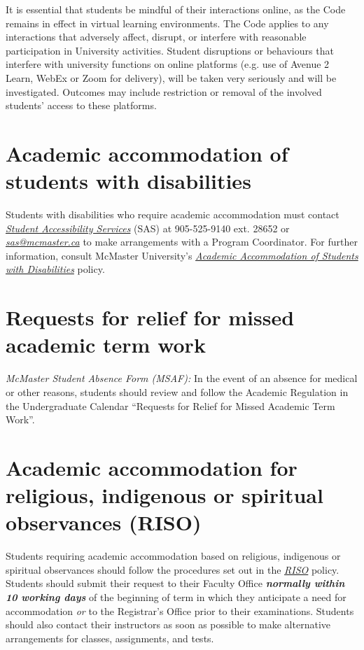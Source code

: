 \documentclass[12pt]{article}
\begin{document}
It is essential that students be mindful of their interactions online,
as the Code remains in effect in virtual learning environments. The Code
applies to any interactions that adversely affect, disrupt, or interfere
with reasonable participation in University activities. Student
disruptions or behaviours that interfere with university functions on
online platforms (e.g. use of Avenue 2 Learn, WebEx or Zoom for
delivery), will be taken very seriously and will be investigated.
Outcomes may include restriction or removal of the involved students'
access to these platforms.

\section*{Academic accommodation of students with disabilities}

Students with disabilities who require academic accommodation must
contact \href{https://sas.mcmaster.ca/}{\emph{Student Accessibility
Services}} (SAS) at 905-525-9140 ext. 28652 or
\href{mailto:sas@mcmaster.ca}{\emph{sas@mcmaster.ca}} to make
arrangements with a Program Coordinator. For further information,
consult McMaster University's
\href{https://secretariat.mcmaster.ca/app/uploads/Academic-Accommodations-Policy.pdf}{\emph{\emph{Academic
Accommodation of Students with Disabilities}}} policy.

\section*{Requests for relief for missed academic term work}

\emph{McMaster Student Absence Form (MSAF):} In the event of an absence
for medical or other reasons, students should review and follow the
Academic Regulation in the Undergraduate Calendar ``Requests for Relief
for Missed Academic Term Work''.

\section*{Academic accommodation for religious, indigenous or spiritual observances (RISO)}

Students requiring academic accommodation based on religious, indigenous
or spiritual observances should follow the procedures set out in the
\href{https://secretariat.mcmaster.ca/app/uploads/2019/02/Academic-Accommodation-for-Religious-Indigenous-and-Spiritual-Observances-Policy-on.pdf}{\emph{RISO}}
policy. Students should submit their request to their Faculty Office
\emph{\textbf{normally within 10 working days}} of the beginning of term
in which they anticipate a need for accommodation \emph{or} to the
Registrar's Office prior to their examinations. Students should also
contact their instructors as soon as possible to make alternative
arrangements for classes, assignments, and tests.
\end{document}
